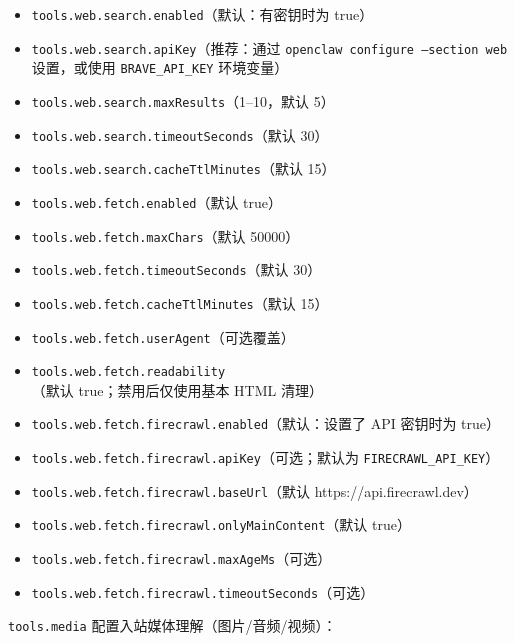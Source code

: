 \begin{itemize}
  \item \texttt{tools.web.search.enabled}（默认：有密钥时为 true）
  \item \texttt{tools.web.search.apiKey}（推荐：通过 \texttt{openclaw configure --section web} 设置，或使用 \texttt{BRAVE\_API\_KEY} 环境变量）
  \item \texttt{tools.web.search.maxResults}（1–10，默认 5）
  \item \texttt{tools.web.search.timeoutSeconds}（默认 30）
  \item \texttt{tools.web.search.cacheTtlMinutes}（默认 15）
  \item \texttt{tools.web.fetch.enabled}（默认 true）
  \item \texttt{tools.web.fetch.maxChars}（默认 50000）
  \item \texttt{tools.web.fetch.timeoutSeconds}（默认 30）
  \item \texttt{tools.web.fetch.cacheTtlMinutes}（默认 15）
  \item \texttt{tools.web.fetch.userAgent}（可选覆盖）
  \item \texttt{tools.web.fetch.readability}（默认 true；禁用后仅使用基本 HTML 清理）
  \item \texttt{tools.web.fetch.firecrawl.enabled}（默认：设置了 API 密钥时为 true）
  \item \texttt{tools.web.fetch.firecrawl.apiKey}（可选；默认为 \texttt{FIRECRAWL\_API\_KEY}）
  \item \texttt{tools.web.fetch.firecrawl.baseUrl}（默认 https://api.firecrawl.dev）
  \item \texttt{tools.web.fetch.firecrawl.onlyMainContent}（默认 true）
  \item \texttt{tools.web.fetch.firecrawl.maxAgeMs}（可选）
  \item \texttt{tools.web.fetch.firecrawl.timeoutSeconds}（可选）
\end{itemize}


\texttt{tools.media} 配置入站媒体理解（图片/音频/视频）：

